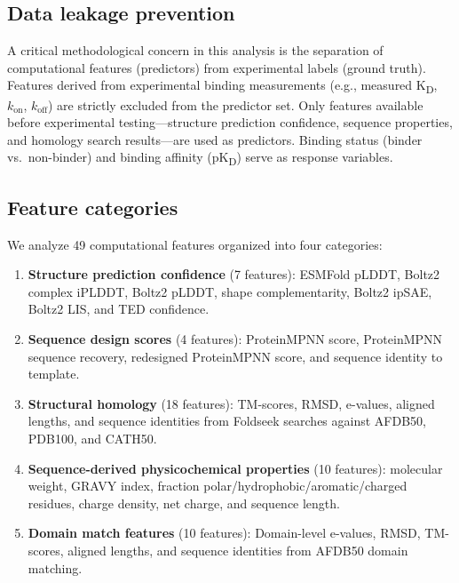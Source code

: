 \documentclass[11pt,a4paper]{article}
\newcommand{\pKD}{pK\textsubscript{D}}
\newcommand{\KD}{K\textsubscript{D}}
\begin{document}
\subsection{Data leakage prevention}

A critical methodological concern in this analysis is the separation of computational features (predictors) from experimental labels (ground truth).
Features derived from experimental binding measurements (e.g., measured \KD, $k_{\text{on}}$, $k_{\text{off}}$) are strictly excluded from the predictor set.
Only features available before experimental testing---structure prediction confidence, sequence properties, and homology search results---are used as predictors.
Binding status (binder vs.\ non-binder) and binding affinity (\pKD) serve as response variables.

\subsection{Feature categories}

We analyze 49 computational features organized into four categories:

\begin{enumerate}
    \item \textbf{Structure prediction confidence} (7 features): ESMFold pLDDT, Boltz2 complex iPLDDT, Boltz2 pLDDT, shape complementarity, Boltz2 ipSAE, Boltz2 LIS, and TED confidence.

    \item \textbf{Sequence design scores} (4 features): ProteinMPNN score, ProteinMPNN sequence recovery, redesigned ProteinMPNN score, and sequence identity to template.

    \item \textbf{Structural homology} (18 features): TM-scores, RMSD, e-values, aligned lengths, and sequence identities from Foldseek searches against AFDB50, PDB100, and CATH50.

    \item \textbf{Sequence-derived physicochemical properties} (10 features): molecular weight, GRAVY index, fraction polar/hydrophobic/aromatic/charged residues, charge density, net charge, and sequence length.

    \item \textbf{Domain match features} (10 features): Domain-level e-values, RMSD, TM-scores, aligned lengths, and sequence identities from AFDB50 domain matching.
\end{enumerate}
\end{document}
